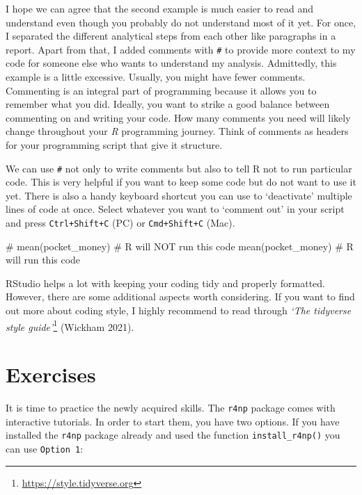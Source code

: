 \documentclass[
  letterpaper,
]{krantz}
\makeatletter
\newenvironment{Shaded}{\begin{snugshade}}{\end{snugshade}}
\newcommand{\CommentTok}[1]{\textcolor[rgb]{0.37,0.37,0.37}{#1}}
\newcommand{\FunctionTok}[1]{\textcolor[rgb]{0.28,0.35,0.67}{#1}}
\newcommand{\NormalTok}[1]{\textcolor[rgb]{0.00,0.23,0.31}{#1}}
\renewcommand{\href}[2]{#2\footnote{\url{#1}}}
\newenvironment{kframe}{%
\medskip{}
\setlength{\fboxsep}{.8em}
 \def\at@end@of@kframe{}%
 \ifinner\ifhmode%
  \def\at@end@of@kframe{\end{minipage}}%
  \begin{minipage}{\columnwidth}%
 \fi\fi%
 \def\FrameCommand##1{\hskip\@totalleftmargin \hskip-\fboxsep
 \colorbox{shadecolor}{##1}\hskip-\fboxsep
     \hskip-\linewidth \hskip-\@totalleftmargin \hskip\columnwidth}%
 \MakeFramed {\advance\hsize-\width
   \@totalleftmargin\z@ \linewidth\hsize
   \@setminipage}}%
 {\par\unskip\endMakeFramed%
 \at@end@of@kframe}
\renewenvironment{Shaded}{\begin{kframe}}{\end{kframe}}
\makeatother
\begin{document}
I hope we can agree that the second example is much easier to read and
understand even though you probably do not understand most of it yet.
For once, I separated the different analytical steps from each other
like paragraphs in a report. Apart from that, I added comments with
\texttt{\#} to provide more context to my code for someone else who
wants to understand my analysis. Admittedly, this example is a little
excessive. Usually, you might have fewer comments. Commenting is an
integral part of programming because it allows you to remember what you
did. Ideally, you want to strike a good balance between commenting on
and writing your code. How many comments you need will likely change
throughout your \emph{R} programming journey. Think of comments as
headers for your programming script that give it structure.

We can use \texttt{\#} not only to write comments but also to tell R not
to run particular code. This is very helpful if you want to keep some
code but do not want to use it yet. There is also a handy keyboard
shortcut you can use to `deactivate' multiple lines of code at once.
Select whatever you want to `comment out' in your script and press
\texttt{Ctrl+Shift+C} (PC) or \texttt{Cmd+Shift+C} (Mac).

\begin{Shaded}
\begin{Highlighting}[]
\CommentTok{\# mean(pocket\_money) \# R will NOT run this code}
\FunctionTok{mean}\NormalTok{(pocket\_money)   }\CommentTok{\# R will run this code}
\end{Highlighting}
\end{Shaded}

RStudio helps a lot with keeping your coding tidy and properly
formatted. However, there are some additional aspects worth considering.
If you want to find out more about coding style, I highly recommend to
read through \href{https://style.tidyverse.org}{\emph{`The tidyverse
style guide'}} (Wickham 2021).\\

\section{Exercises}\label{exercises-r_basics}

It is time to practice the newly acquired skills. The \texttt{r4np}
package comes with interactive tutorials. In order to start them, you
have two options. If you have installed the \texttt{r4np} package
already and used the function \texttt{install\_r4np()} you can use
\texttt{Option\ 1}:
\end{document}
